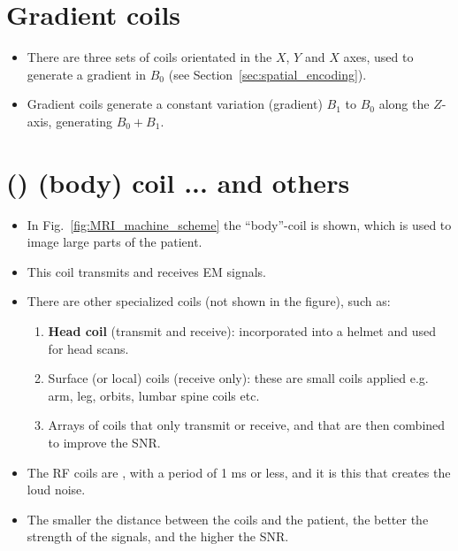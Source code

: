 \section{Gradient coils}
\begin{itemize}
\item There are three sets of coils orientated in the $X$, $Y$ and $X$
  axes, used to generate a gradient in $B_0$ (see
  Section~\ref{sec:spatial_encoding}).
\item Gradient coils generate a constant variation (gradient) $B_1$ to
  $B_0$ along the $Z$-axis, generating $B_0+B_1$.
\end{itemize}

\section{ () (body) coil ... and others}
\begin{itemize}
\item In Fig.~\ref{fig:MRI_machine_scheme} the ``body''-coil is shown,
  which is used to image large parts of the patient.
\item This coil transmits and receives \gls{EM} signals.
\item There are other specialized coils (not shown in the figure),
  such as:
  \begin{enumerate}
  \item \textbf{Head coil} (transmit and receive): incorporated into a
    helmet and used for head scans.
  \item Surface (or local) coils (receive only): these are small coils
    applied  e.g. arm, leg, orbits, lumbar spine coils
    etc.
  \item Arrays of coils that only transmit or receive, and that are
    then combined to improve the SNR.
  \end{enumerate}
\item The RF \cite{wikipedia_RF} coils are , with
  a period of 1 ms or less, and it is this that creates the loud
  noise.
\item The smaller the distance between the coils and the patient, the
  better the strength of the signals, and the higher the \gls{SNR}.
\end{itemize}

